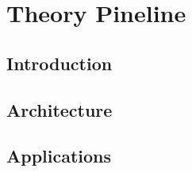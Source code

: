 
\chapter{Theory Pineline}
\label{ch:pine}
\minitoc
\adjustmtc

\section{Introduction}
\label{sec:pine/intro}


\section{Architecture}
\label{sec:pine/arch}


\section{Applications}
\label{sec:pine/app}

